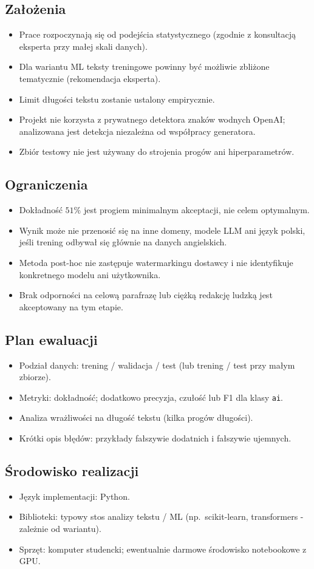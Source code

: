 \subsection{Założenia}

\begin{itemize}
	\item Prace rozpoczynają się od podejścia statystycznego (zgodnie z konsultacją eksperta przy małej skali danych).
	\item Dla wariantu ML teksty treningowe powinny być możliwie zbliżone tematycznie (rekomendacja eksperta).
	\item Limit długości tekstu zostanie ustalony empirycznie.
	\item Projekt nie korzysta z prywatnego detektora znaków wodnych OpenAI; analizowana jest detekcja niezależna od współpracy generatora.
	\item Zbiór testowy nie jest używany do strojenia progów ani hiperparametrów.
\end{itemize}

\subsection{Ograniczenia}

\begin{itemize}
	\item Dokładność $51\%$ jest progiem minimalnym akceptacji, nie celem optymalnym.
	\item Wynik może nie przenosić się na inne domeny, modele LLM ani język polski, jeśli trening odbywał się głównie na danych angielskich.
	\item Metoda post-hoc nie zastępuje watermarkingu dostawcy i nie identyfikuje konkretnego modelu ani użytkownika.
	\item Brak odporności na celową parafrazę lub ciężką redakcję ludzką jest akceptowany na tym etapie.
\end{itemize}

\subsection{Plan ewaluacji}

\begin{itemize}
	\item Podział danych: trening / walidacja / test (lub trening / test przy małym zbiorze).
	\item Metryki: dokładność; dodatkowo precyzja, czułość lub F1 dla klasy \texttt{ai}.
	\item Analiza wrażliwości na długość tekstu (kilka progów długości).
	\item Krótki opis błędów: przykłady fałszywie dodatnich i fałszywie ujemnych.
\end{itemize}

\subsection{Środowisko realizacji}

\begin{itemize}
	\item Język implementacji: Python.
	\item Biblioteki: typowy stos analizy tekstu / ML (np.\ scikit-learn, transformers - zależnie od wariantu).
	\item Sprzęt: komputer studencki; ewentualnie darmowe środowisko notebookowe z GPU.
\end{itemize}
